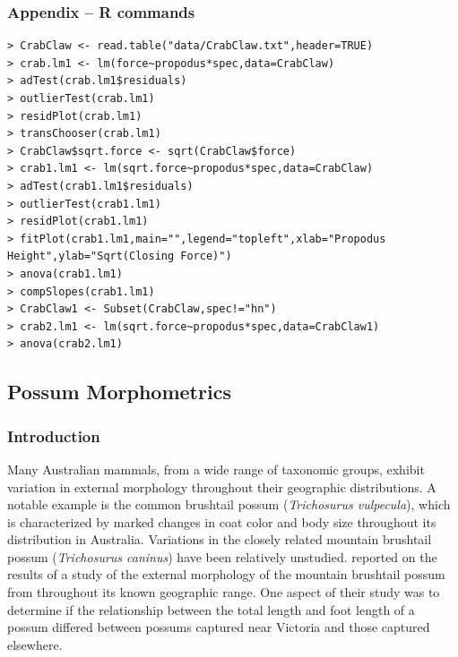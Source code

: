 \documentclass[10pt,openany]{book}\usepackage[]{graphicx}\usepackage[]{color}
\begin{document}
\subsubsection*{Appendix -- R commands}
\begin{Verbatim}[formatcom=\color{red},xleftmargin=5mm,commandchars=\\\{\}]
> CrabClaw <- read.table("data/CrabClaw.txt",header=TRUE)
> crab.lm1 <- lm(force~propodus*spec,data=CrabClaw)
> adTest(crab.lm1$residuals)
> outlierTest(crab.lm1)
> residPlot(crab.lm1)
> transChooser(crab.lm1)
> CrabClaw$sqrt.force <- sqrt(CrabClaw$force)
> crab1.lm1 <- lm(sqrt.force~propodus*spec,data=CrabClaw)
> adTest(crab1.lm1$residuals)
> outlierTest(crab1.lm1)
> residPlot(crab1.lm1)
> fitPlot(crab1.lm1,main="",legend="topleft",xlab="Propodus Height",ylab="Sqrt(Closing Force)")
> anova(crab1.lm1)
> compSlopes(crab1.lm1)
> CrabClaw1 <- Subset(CrabClaw,spec!="hn")
> crab2.lm1 <- lm(sqrt.force~propodus*spec,data=CrabClaw1)
> anova(crab2.lm1)
\end{Verbatim}


\subsection{Possum Morphometrics}
\subsubsection*{Introduction}
Many Australian mammals, from a wide range of taxonomic groups, exhibit variation in external morphology throughout their geographic distributions.  A notable example is the common brushtail possum (\emph{Trichosurus vulpecula}), which is characterized by marked changes in coat color and body size throughout its distribution in Australia.  Variations in the closely related mountain brushtail possum (\emph{Trichosurus caninus}) have been relatively unstudied.  \cite{Lindenmayeretal1995} reported on the results of a study of the external morphology of the mountain brushtail possum from throughout its known geographic range.  One aspect of their study was to determine if the relationship between the total length and foot length of a possum differed between possums captured near Victoria and those captured elsewhere.
\end{document}
